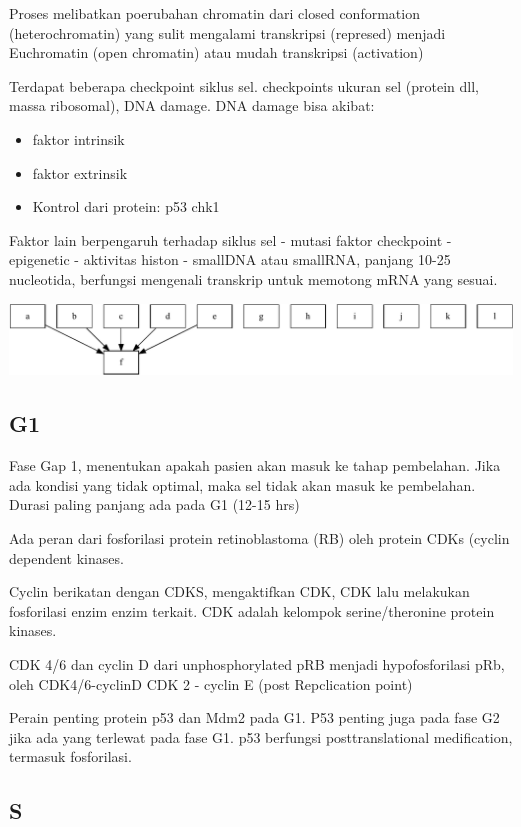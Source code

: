 \documentclass[
  letterpaper,
  DIV=11,
  numbers=noendperiod]{scrreprt}
\providecommand{\tightlist}{%
  \setlength{\itemsep}{0pt}\setlength{\parskip}{0pt}}\usepackage{longtable,booktabs,array}
\begin{document}
Proses melibatkan poerubahan chromatin dari closed conformation
(heterochromatin) yang sulit mengalami transkripsi (represed) menjadi
Euchromatin (open chromatin) atau mudah transkripsi (activation)

Terdapat beberapa checkpoint siklus sel. checkpoints ukuran sel (protein
dll, massa ribosomal), DNA damage. DNA damage bisa akibat:

\begin{itemize}
\tightlist
\item
  faktor intrinsik
\item
  faktor extrinsik
\item
  Kontrol dari protein: p53 chk1
\end{itemize}

Faktor lain berpengaruh terhadap siklus sel - mutasi faktor checkpoint -
epigenetic - aktivitas histon - smallDNA atau smallRNA, panjang 10-25
nucleotida, berfungsi mengenali transkrip untuk memotong mRNA yang
sesuai.

\includegraphics{biomol_files/figure-pdf/unnamed-chunk-2-1.pdf}

\subsection{G1}\label{g1}

Fase Gap 1, menentukan apakah pasien akan masuk ke tahap pembelahan.
Jika ada kondisi yang tidak optimal, maka sel tidak akan masuk ke
pembelahan. Durasi paling panjang ada pada G1 (12-15 hrs)

Ada peran dari fosforilasi protein retinoblastoma (RB) oleh protein CDKs
(cyclin dependent kinases.

Cyclin berikatan dengan CDKS, mengaktifkan CDK, CDK lalu melakukan
fosforilasi enzim enzim terkait. CDK adalah kelompok serine/theronine
protein kinases.

CDK 4/6 dan cyclin D dari unphosphorylated pRB menjadi hypofosforilasi
pRb, oleh CDK4/6-cyclinD CDK 2 - cyclin E (post Repclication point)

Perain penting protein p53 dan Mdm2 pada G1. P53 penting juga pada fase
G2 jika ada yang terlewat pada fase G1. p53 berfungsi posttranslational
medification, termasuk fosforilasi.

\subsection{S}\label{s}
\end{document}
